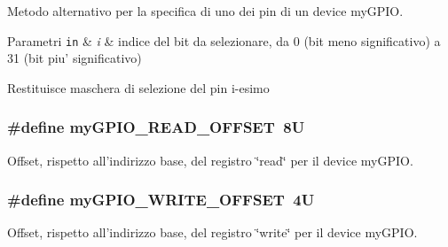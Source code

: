 Metodo alternativo per la specifica di uno dei pin di un device my\+G\+P\+I\+O. 


\begin{DoxyParams}[1]{Parametri}
\mbox{\tt in}  & {\em i} & indice del bit da selezionare, da 0 (bit meno significativo) a 31 (bit piu' significativo) \\
\hline
\end{DoxyParams}
\begin{DoxyReturn}{Restituisce}
maschera di selezione del pin i-\/esimo 
\end{DoxyReturn}
\hypertarget{group__my_g_p_i_o_ga584d2dfece76e5762030d918d80592cc}{
\subsubsection[{my\+G\+P\+I\+O\+\_\+\+R\+E\+A\+D\+\_\+\+O\+F\+F\+S\+E\+T}]{\setlength{\rightskip}{0pt plus 5cm}\#define my\+G\+P\+I\+O\+\_\+\+R\+E\+A\+D\+\_\+\+O\+F\+F\+S\+E\+T~8\+U}}\label{group__my_g_p_i_o_ga584d2dfece76e5762030d918d80592cc}


Offset, rispetto all'indirizzo base, del registro \char`\"{}read\char`\"{} per il device my\+G\+P\+I\+O. 

\hypertarget{group__my_g_p_i_o_ga2e45778b6ca9ce6f5768b3f7a4557ce1}{
\subsubsection[{my\+G\+P\+I\+O\+\_\+\+W\+R\+I\+T\+E\+\_\+\+O\+F\+F\+S\+E\+T}]{\setlength{\rightskip}{0pt plus 5cm}\#define my\+G\+P\+I\+O\+\_\+\+W\+R\+I\+T\+E\+\_\+\+O\+F\+F\+S\+E\+T~4\+U}}\label{group__my_g_p_i_o_ga2e45778b6ca9ce6f5768b3f7a4557ce1}


Offset, rispetto all'indirizzo base, del registro \char`\"{}write\char`\"{} per il device my\+G\+P\+I\+O. 



